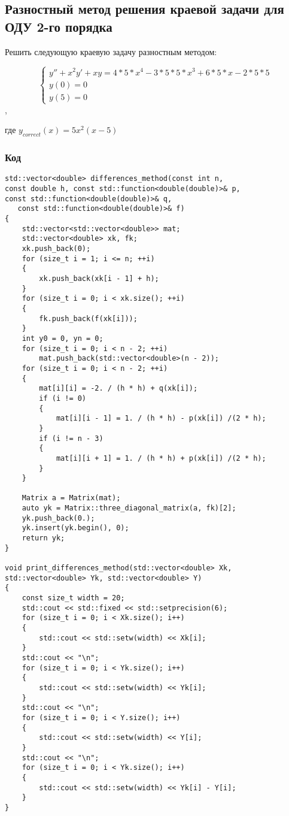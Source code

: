 \documentclass[bachelor, och, pract]{SCWorks}
\begin{document}
\subsection{Разностный метод решения краевой задачи
для ОДУ 2-го порядка}

Решить следующую краевую задачу разностным методом:

$$ 

\begin{cases}
y'' + x^2y' + xy = 4 * 5 * x^4 - 3 * 5 * 5 * x^3 + 6 * 5 * x - 2 * 5 * 5 \\
y(0) = 0\\
y(5) = 0
\end{cases} $$,

где $y_{correct}(x) = 5x^2(x-5)$


\subsubsection{Код}

\begin{lstlisting}
std::vector<double> differences_method(const int n, 
const double h, const std::function<double(double)>& p,
const std::function<double(double)>& q, 
   const std::function<double(double)>& f)
{
    std::vector<std::vector<double>> mat;
    std::vector<double> xk, fk;
    xk.push_back(0);
    for (size_t i = 1; i <= n; ++i)
    {
        xk.push_back(xk[i - 1] + h);
    }
    for (size_t i = 0; i < xk.size(); ++i)
    {
        fk.push_back(f(xk[i]));
    }
    int y0 = 0, yn = 0;
    for (size_t i = 0; i < n - 2; ++i)
        mat.push_back(std::vector<double>(n - 2));
    for (size_t i = 0; i < n - 2; ++i)
    {
        mat[i][i] = -2. / (h * h) + q(xk[i]);
        if (i != 0)
        {
            mat[i][i - 1] = 1. / (h * h) - p(xk[i]) /(2 * h);
        }
        if (i != n - 3)
        {
            mat[i][i + 1] = 1. / (h * h) + p(xk[i]) /(2 * h);
        }
    }

    Matrix a = Matrix(mat);
    auto yk = Matrix::three_diagonal_matrix(a, fk)[2];
    yk.push_back(0.);
    yk.insert(yk.begin(), 0);
    return yk;
}

void print_differences_method(std::vector<double> Xk, 
std::vector<double> Yk, std::vector<double> Y)
{
    const size_t width = 20;
    std::cout << std::fixed << std::setprecision(6);
    for (size_t i = 0; i < Xk.size(); i++)
    {
        std::cout << std::setw(width) << Xk[i];
    }
    std::cout << "\n";
    for (size_t i = 0; i < Yk.size(); i++)
    {
        std::cout << std::setw(width) << Yk[i];
    }
    std::cout << "\n";
    for (size_t i = 0; i < Y.size(); i++)
    {
        std::cout << std::setw(width) << Y[i];
    }
    std::cout << "\n";
    for (size_t i = 0; i < Yk.size(); i++)
    {
        std::cout << std::setw(width) << Yk[i] - Y[i];
    }
}
\end{lstlisting}
\end{document}
